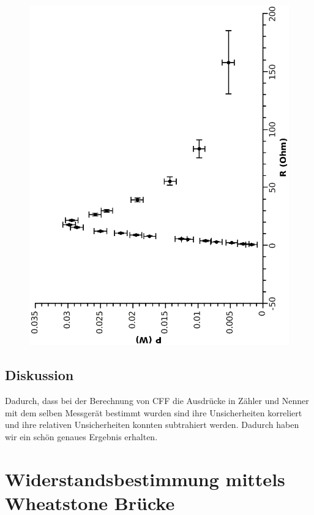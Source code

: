 \documentclass{article}
\begin{document}
\begin{center}
\begin{figure}
\includegraphics[scale=0.6,angle=-90]{leistung.eps}
\end{figure}
\end{center}
\subsection{Diskussion}
Dadurch, dass bei der Berechnung von CFF die Ausdrücke in Zähler und Nenner mit dem selben Messgerät bestimmt wurden sind ihre Unsicherheiten korreliert und ihre relativen Unsicherheiten konnten subtrahiert werden. Dadurch haben wir ein schön genaues Ergebnis erhalten.\\
\newpage


\section{Widerstandsbestimmung mittels Wheatstone Brücke}
\end{document}
